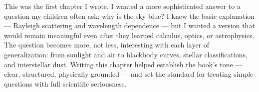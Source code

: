 \begin{commentary}
This was the first chapter I wrote. I wanted a more sophisticated answer to a question my children often ask: why is the sky blue? I knew the basic explanation --- Rayleigh scattering and wavelength dependence --- but I wanted a version that would remain meaningful even after they learned calculus, optics, or astrophysics. The question becomes more, not less, interesting with each layer of generalization: from sunlight and air to blackbody curves, stellar classifications, and interstellar dust. Writing this chapter helped establish the book's tone --- clear, structured, physically grounded --- and set the standard for treating simple questions with full scientific seriousness.
\end{commentary}